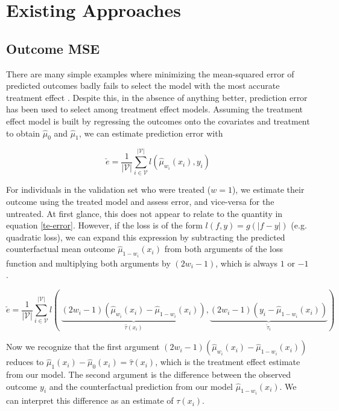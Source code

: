 \section{Existing Approaches}
\label{approaches}

\subsection{Outcome MSE}

There are many simple examples where minimizing the mean-squared error of predicted outcomes badly fails to select the model with the most accurate treatment effect \cite{Rolling:2013kz}. Despite this, in the absence of anything better, prediction error has been used to select among treatment effect models. Assuming the treatment effect model is built by regressing the outcomes onto the covariates and treatment to obtain $\hat\mu_0$ and $\hat\mu_1$, we can estimate prediction error with

\begin{equation}
	\check e = \frac{1}{|\mathcal{V}|} \sum_{i \in \mathcal{V}}^{|\mathcal{V}|}  
	l(\hat \mu_{w_i} (x_i), y_i) 
\label{pred-error}
\end{equation}
 
For individuals in the validation set who were treated ($w=1$), we estimate their outcome using the treated model and assess error, and vice-versa for the untreated. At first glance, this does not appear to relate to the quantity in equation \ref{te-error}. However, if the loss is of the form $l(f,y) = g(|f-y|)$ (e.g. quadratic loss), we can expand this expression by subtracting the predicted counterfactual mean outcome $\hat\mu_{1-w_i}(x_i)$ from both arguments of the loss function and multiplying both arguments by $(2w_i -1)$, which is always $1$ or $-1$.

\begin{equation}
	\check e = \frac{1}{|\mathcal{V}|} \sum_{i \in \mathcal{V}}^{|\mathcal{V}|}  
	l( \ 
	\underbrace{(2w_i -1) (\hat\mu_{w_i} (x_i) - \hat\mu_{1-w_i}(x_i))}_{\hat\tau(x_i)}, 
	\underbrace{(2w_i -1) (y_i - \hat\mu_{1-w_i}(x_i))}_{\check\tau_i}
	) 
\label{pred-error-expansion}
\end{equation}

Now we recognize that the first argument $(2w_i -1) (\hat\mu_{w_i} (x_i) - \hat\mu_{1-w_i}(x_i))$ reduces to $\hat\mu_1 (x_i) - \hat\mu_0(x_i) = \hat\tau(x_i)$, which is the treatment effect estimate from our model. The second argument is the difference between the observed outcome $y_i$ and the counterfactual prediction from our model $\hat\mu_{1-w_i}(x_i)$. We can interpret this difference as an estimate of $\tau(x_i)$. 

